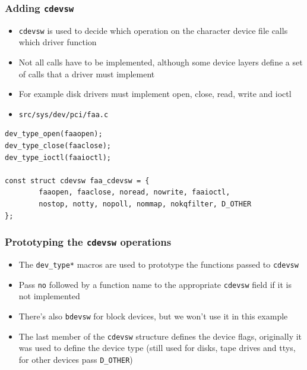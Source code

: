 \documentclass[dvipsnames,table]{beamer}
\begin{document}
\begin{frame}[fragile]
\frametitle{Adding {\tt cdevsw}}
\begin{itemize}
	\item {\tt cdevsw} is used to decide which operation on the character device file calls which driver function
	\item Not all calls have to be implemented, although some device layers define a set of calls that a driver must implement
	\item For example disk drivers must implement open, close, read, write and ioctl
\end{itemize}
\begin{itemize}
	\item {\tt src/sys/dev/pci/faa.c}
\end{itemize}
\begin{lstlisting}
dev_type_open(faaopen);
dev_type_close(faaclose);
dev_type_ioctl(faaioctl);

const struct cdevsw faa_cdevsw = {
        faaopen, faaclose, noread, nowrite, faaioctl,
        nostop, notty, nopoll, nommap, nokqfilter, D_OTHER
};
\end{lstlisting}
\end{frame}

\begin{frame}
\frametitle{Prototyping the {\tt cdevsw} operations}
\begin{itemize}
	\item The {\tt dev\_type*} macros are used to prototype the functions passed to {\tt cdevsw}
	\item Pass {\tt no} followed by a function name to the appropriate {\tt cdevsw} field if it is not implemented  
	\item There's also {\tt bdevsw} for block devices, but we won't use it in this example
	\item The last member of the {\tt cdevsw} structure defines the device flags, originally it was used to define the device type (still used for disks, tape drives and ttys, for other devices pass {\tt D\_OTHER})
\end{itemize}
\end{frame}
\end{document}
